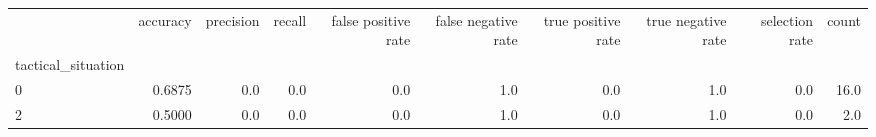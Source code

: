 \begin{tabular}{lrrrrrrrrr}
\toprule
{} &  accuracy &  precision &  recall &  false positive rate &  false negative rate &  true positive rate &  true negative rate &  selection rate &  count \\
tactical\_situation &           &            &         &                      &                      &                     &                     &                 &        \\
\midrule
0                  &    0.6875 &        0.0 &     0.0 &                  0.0 &                  1.0 &                 0.0 &                 1.0 &             0.0 &   16.0 \\
2                  &    0.5000 &        0.0 &     0.0 &                  0.0 &                  1.0 &                 0.0 &                 1.0 &             0.0 &    2.0 \\
\bottomrule
\end{tabular}
